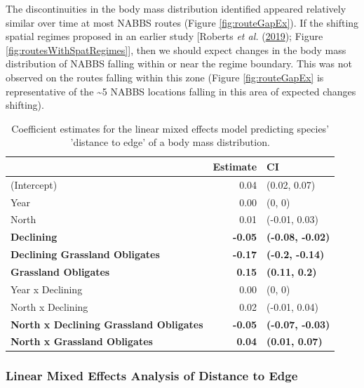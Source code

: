 \documentclass[12pt,twoside,openany]{reedthesis}
\begin{document}
The discontinuities in the body mass distribution identified appeared relatively similar over time at most NABBS routes (Figure \ref{fig:routeGapEx}). If the shifting spatial regimes proposed in an earlier study {[}Roberts \emph{et al.} (\protect\hyperlink{ref-roberts2019shifting}{2019}); Figure \ref{fig:routesWithSpatRegimes}{]}, then we should expect changes in the body mass distribution of NABBS falling within or near the regime boundary. This was not observed on the routes falling within this zone (Figure \ref{fig:routeGapEx} is representative of the \textasciitilde5 NABBS locations falling in this area of expected changes shifting).
\begin{table}[t]

\caption{\label{tab:lmeTab}Coefficient estimates for the linear mixed effects model predicting species' 'distance to edge' of a body mass distribution.}
\centering
\begin{tabular}{lrl}
\toprule
  & Estimate & CI\\
\midrule
(Intercept) & 0.04 & (0.02, 0.07)\\
Year & 0.00 & (0, 0)\\
North & 0.01 & (-0.01, 0.03)\\
\textbf{Declining} & \textbf{-0.05} & \textbf{(-0.08, -0.02)}\\
\textbf{Declining Grassland Obligates} & \textbf{-0.17} & \textbf{(-0.2, -0.14)}\\
\addlinespace
\textbf{Grassland Obligates} & \textbf{0.15} & \textbf{(0.11, 0.2)}\\
Year x Declining & 0.00 & (0, 0)\\
North x Declining & 0.02 & (-0.01, 0.04)\\
\textbf{North x Declining Grassland Obligates} & \textbf{-0.05} & \textbf{(-0.07, -0.03)}\\
\textbf{North x Grassland Obligates} & \textbf{0.04} & \textbf{(0.01, 0.07)}\\
\bottomrule
\end{tabular}
\end{table}
\hypertarget{linear-mixed-effects-analysis-of-distance-to-edge}{%
\subsubsection{Linear Mixed Effects Analysis of Distance to Edge}\label{linear-mixed-effects-analysis-of-distance-to-edge}}
\end{document}
